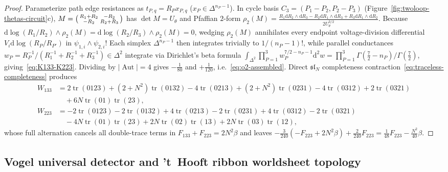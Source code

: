 \documentclass[11pt,letterpaper]{article}
\numberwithin{equation}{section}
\theoremstyle{plain}
\theoremstyle{definition}
\theoremstyle{remark}
\newcommand{\dd}{\mathrm{d}}
\newcommand{\fsl}{\mathfrak{sl}}
\newcommand{\tr}{\operatorname{tr}}
\newcommand{\Aut}{\operatorname{Aut}}
\begin{document}
\begin{proof}
Parameterize path edge resistances as $t_{P,q} = R_P x_{P,q}$ ($x_P \in \Delta^{n_P-1}$). In cycle basis $C_3 = (P_1-P_2, P_2-P_3)$ (Figure~\ref{fig:twoloop-thetas-circuit}c), $M = \begin{psmallmatrix}R_1+R_2 & -R_2\\ -R_2 & R_2+R_3\end{psmallmatrix}$ has $\det M = U_\theta$ and Pfaffian $2$-form $\rho_2(M) = \frac{R_1\dd R_2\wedge\dd R_3 - R_2\dd R_1\wedge\dd R_3 + R_3\dd R_1\wedge\dd R_2}{2U_\theta^{3/2}}$. Because $\dd\log(R_1/R_2)\wedge\rho_2(M) = \dd\log(R_2/R_3)\wedge\rho_2(M) = 0$, wedging $\rho_2(M)$ annihilates every endpoint voltage-division differential $V_i\dd\log(R_P/R_{P'})$ in $\psi_{1,i}\wedge\psi_{2,i}$! Each simplex $\Delta^{n_P-1}$ then integrates trivially to $1/(n_P-1)!$, while parallel conductances $w_P = R_P^{-1}/(R_1^{-1}+R_2^{-1}+R_3^{-1}) \in \Delta^2$ integrate via Dirichlet's beta formula $\int_{\Delta^2}\prod_{P=1}^3 w_P^{7/2-n_P-1}\dd^2w = \prod_{P=1}^3\Gamma(\frac{7}{2}-n_P)/\Gamma(\frac{7}{2})$, giving~\eqref{eq:K133-K223}. Dividing by $|\Aut| = 4$ gives $-\frac{1}{80}$ and $+\frac{1}{120}$, i.e.~\eqref{eq:o2-assembled}. Direct $\fsl_N$ completeness contraction~\eqref{eq:traceless-completeness} produces
\begin{align}
\label{eq:W133-W223-traces}
W_{133} &= 2\tr(0123) + (2{+}N^2)\tr(0132) - 4\tr(0213) + (2{+}N^2)\tr(0231) - 4\tr(0312) + 2\tr(0321) \nonumber\\
&\quad + 6N\tr(01)\tr(23), \nonumber\\
W_{223} &= -2\tr(0123) - 2\tr(0132) + 4\tr(0213) - 2\tr(0231) + 4\tr(0312) - 2\tr(0321) \nonumber\\
&\quad - 4N\tr(01)\tr(23) + 2N\tr(02)\tr(13) + 2N\tr(03)\tr(12),
\end{align}
whose full alternation cancels all double-trace terms in $F_{133} + F_{223} = 2N^2\beta$ and leaves $-\frac{3}{240}(-F_{223}+2N^2\beta)+\frac{2}{240}F_{223} = \frac{1}{48}F_{223} - \frac{N^2}{40}\beta$.
\end{proof}

\subsection{Vogel universal detector and 't~Hooft ribbon worldsheet topology}
\label{subsec:vogel-ribbon}
\end{document}
